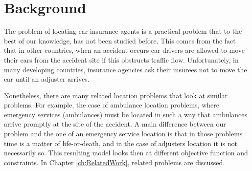 \section{Background}
The problem of locating car insurance agents
is a practical problem
that to the best of our knowledge,
has not been studied before.
This comes
from the fact
that in other countries,
when an accident occurs
car drivers
are allowed to move their cars
from the accident site
if this obstructs traffic flow.
Unfortunately,
in many developing countries,
insurance agencies
ask their insurees
not to move the car
until an adjuster arrives.

Nonetheless,
there are many related location problems
that look at similar problems.
For example,
the case of
ambulance location problems,
where emergency services (ambulances)
must be located
in such a way that
ambulances arrive promptly
at the site of the accident.
A main difference
between our problem
and the one
of an emergency service location
is that in those problems
time is a matter of life-or-death,
and in the case of adjusters location
it is not necessarily so.
This resulting model
looks then at different objective function
and constraints.
In Chapter \ref{ch:RelatedWork},
related problems are discussed.
